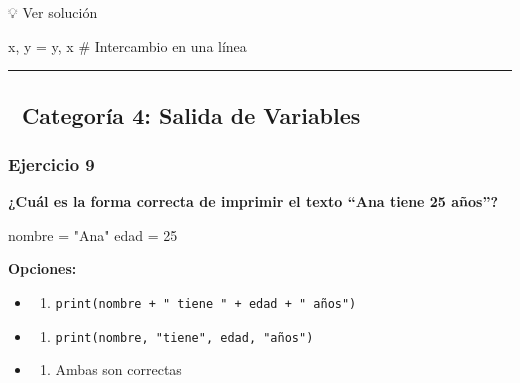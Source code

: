 \documentclass[
  doc,
  floatsintext,
  longtable,
  a4paper,
  nolmodern,
  notxfonts,
  notimes,
  12pt,
  colorlinks=true,linkcolor=blue,citecolor=blue,urlcolor=blue]{apa7}
\newenvironment{Shaded}{\begin{snugshade}}{\end{snugshade}}
\newcommand{\CommentTok}[1]{\textcolor[rgb]{0.37,0.37,0.37}{#1}}
\newcommand{\DecValTok}[1]{\textcolor[rgb]{0.68,0.00,0.00}{#1}}
\newcommand{\NormalTok}[1]{\textcolor[rgb]{0.00,0.23,0.31}{#1}}
\newcommand{\OperatorTok}[1]{\textcolor[rgb]{0.37,0.37,0.37}{#1}}
\newcommand{\StringTok}[1]{\textcolor[rgb]{0.13,0.47,0.30}{#1}}
\providecommand{\tightlist}{%
  \setlength{\itemsep}{0pt}\setlength{\parskip}{0pt}}
\begin{document}
💡 Ver solución

\begin{Shaded}
\begin{Highlighting}[]
\NormalTok{x, y }\OperatorTok{=}\NormalTok{ y, x  }\CommentTok{\# Intercambio en una línea}
\end{Highlighting}
\end{Shaded}

\begin{center}\rule{0.5\linewidth}{0.5pt}\end{center}

\subsection{📌 Categoría 4: Salida de
Variables}\label{categoruxeda-4-salida-de-variables}

\subsubsection{Ejercicio 9}\label{ejercicio-9}

\textbf{¿Cuál es la forma correcta de imprimir el texto ``Ana tiene 25
años''?}

\begin{Shaded}
\begin{Highlighting}[]
\NormalTok{nombre }\OperatorTok{=} \StringTok{"Ana"}
\NormalTok{edad }\OperatorTok{=} \DecValTok{25}
\end{Highlighting}
\end{Shaded}

\textbf{Opciones:}

\begin{itemize}
\tightlist
\item
  \begin{enumerate}
  \def\labelenumi{\Alph{enumi})}
  \tightlist
  \item
    \texttt{print(nombre\ +\ "\ tiene\ "\ +\ edad\ +\ "\ años")}
  \end{enumerate}
\item
  \begin{enumerate}
  \def\labelenumi{\Alph{enumi})}
  \setcounter{enumi}{1}
  \tightlist
  \item
    \texttt{print(nombre,\ "tiene",\ edad,\ "años")}
  \end{enumerate}
\item
  \begin{enumerate}
  \def\labelenumi{\Alph{enumi})}
  \setcounter{enumi}{2}
  \tightlist
  \item
    Ambas son correctas
  \end{enumerate}
\end{itemize}
\end{document}
